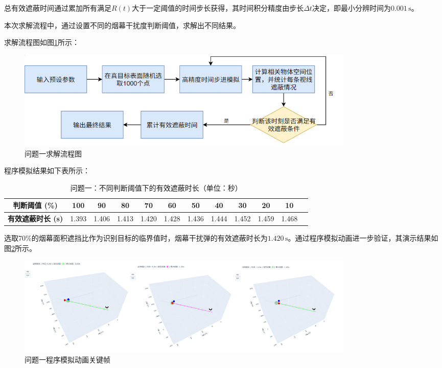 \documentclass[12pt]{article}
\begin{document}
\begin{CJK}{UTF8}{gbsn}
		总有效遮蔽时间通过累加所有满足$R(t)$大于一定阈值的时间步长获得，其时间积分精度由步长$\Delta t$决定，即最小分辨时间为$0.001\,\mathrm{s}$。
		
		本次求解流程中，通过设置不同的烟幕干扰度判断阈值，求解出不同结果。
		
		求解流程图如图\ref{fig:flowchart_q1}所示：
		
		\begin{figure}[H]
			\centering
			\includegraphics[width=0.8\textwidth]{pic/Fg2.png}
			\caption{问题一求解流程图}
			\label{fig:flowchart_q1}
		\end{figure}
		
		程序模拟结果如下表所示：
		
		\begin{table}[H]
			\centering
			\caption{问题一：不同判断阈值下的有效遮蔽时长（单位：秒）}
			\label{tab:results_q1}
			\begin{tabular}{cccccccccccc}
				\toprule
				\textbf{判断阈值 (\%)} & \textbf{100} & \textbf{90} & \textbf{80} & \textbf{70} & \textbf{60} & \textbf{50} & \textbf{40} & \textbf{30} & \textbf{20} & \textbf{10} \\
				\midrule
				\textbf{有效遮蔽时长 (s)} & 1.393 & 1.406 & 1.413 & 1.420 & 1.428 & 1.436 & 1.444 & 1.452 & 1.459 & 1.468 \\
				\bottomrule
			\end{tabular}
		\end{table}
		
		选取70\%的烟幕面积遮挡比作为识别目标的临界值时，烟幕干扰弹的有效遮蔽时长为$1.420\,\mathrm{s}$。通过程序模拟动画进一步验证，其演示结果如图\ref{fig:simulation_q1}所示。
		
		\begin{figure}[H]
			\centering
			\includegraphics[width=0.8\textwidth]{pic/Fg3.png}
			\caption{问题一程序模拟动画关键帧}
			\label{fig:simulation_q1}
		\end{figure}
		

\end{CJK}
\end{document}
